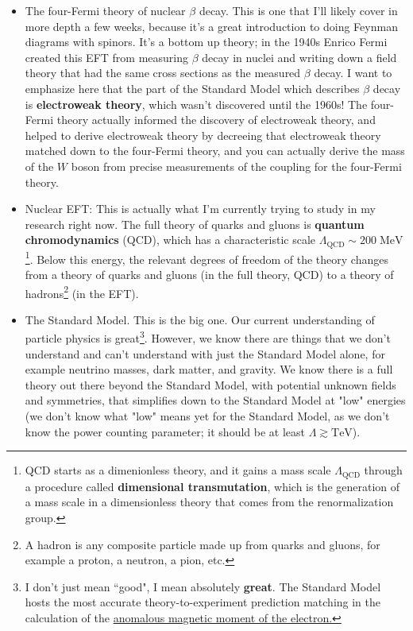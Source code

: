 \documentclass[12pt, oneside]{article}   	%
\theoremstyle{definition}
\begin{document}
\begin{itemize}
\begin{itemize}
		\item The four-Fermi theory of nuclear $\beta$ decay. This is one that I'll likely cover in more depth a few weeks, because it's a great introduction to doing Feynman diagrams with spinors. It's a bottom up theory; in the 1940s Enrico Fermi created this EFT from measuring $\beta$ decay in nuclei and writing down a field theory that had the same cross sections as the measured $\beta$ decay. I want to emphasize here that the part of the Standard Model which describes $\beta$ decay is \textbf{electroweak theory}, which wasn't discovered until the 1960s! The four-Fermi theory actually informed the discovery of electroweak theory, and helped to derive electroweak theory by decreeing that electroweak theory matched down to the four-Fermi theory, and you can actually derive the mass of the $W$ boson from precise measurements of the coupling for the four-Fermi theory.
	
		\item Nuclear EFT: This is actually what I'm currently trying to study in my research right now. The full theory of quarks and gluons is \textbf{quantum chromodynamics} (QCD), which has a characteristic scale $\Lambda_\mathrm{QCD}\sim 200\;\mathrm{MeV}$\footnote{QCD starts as a dimenionless theory, and it gains a mass scale $\Lambda_\mathrm{QCD}$ through a procedure called \textbf{dimensional transmutation}, which is the generation of a mass scale in a dimensionless theory that comes from the renormalization group.}. Below this energy, the relevant degrees of freedom of the theory changes from a theory of quarks and gluons (in the full theory, QCD) to a theory of hadrons\footnote{A hadron is any composite particle made up from quarks and gluons, for example a proton, a neutron, a pion, etc.} (in the EFT). 
		
	
		\item The Standard Model. This is the big one. Our current understanding of particle physics is great\footnote{I don't just mean ``good", I mean absolutely \textbf{great}. The Standard Model hosts the most accurate theory-to-experiment prediction matching in the calculation of the \href{https://en.wikipedia.org/wiki/Anomalous_magnetic_dipole_moment}{anomalous magnetic moment of the electron.}}. However, we know there are things that we don't understand and can't understand with just the Standard Model alone, for example neutrino masses, dark matter, and gravity. We know there is a full theory out there beyond the Standard Model, with potential unknown fields and symmetries, that simplifies down to the Standard Model at "low" energies (we don't know what "low" means yet for the Standard Model, as we don't know the power counting parameter; it should be at least $\Lambda\gtrsim\mathrm{TeV}$). 
	\end{itemize}
\end{itemize}
\end{document}
